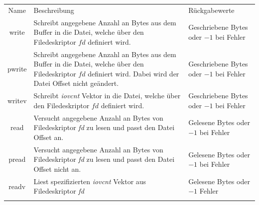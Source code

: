                     \begin{table}[ht]
                        \small
                        \centering
                        \begin{tabular}{cp{6cm}p{3cm}}
                            \hline
                            \rowcolor{GruvGray!36}
                            \multicolumn{3}{c}{System Calls}\\
                            \hline
                            Name & Beschreibung & Rückgabewerte\\
                            \hline
                            \hline
                            \rowcolor{GruvGray!16}
                            write   & Schreibt angegebene Anzahl an Bytes aus dem Buffer in die Datei, welche über den Filedeskriptor $fd$ definiert wird. & Geschriebene Bytes oder $-1$ bei Fehler\\
                            pwrite  & Schreibt angegebene Anzahl an Bytes aus dem Buffer in die Datei, welche über den Filedeskriptor $fd$ definiert wird. Dabei wird der Datei Offset nicht geändert.& Geschriebene Bytes oder $-1$ bei Fehler\\
                            \rowcolor{GruvGray!16}
                            writev  & Schreibt \textit{iovcnt} Vektor in die Datei, welche über den Filedeskriptor $fd$ definiert wird.& Geschriebene Bytes oder $-1$ bei Fehler\\

                            read    & Versucht angegebene Anzahl an Bytes von Filedeskriptor \textit{fd} zu lesen und passt den Datei Offset an.                                              & Gelesene Bytes oder $-1$ bei Fehler\\
                            \rowcolor{GruvGray!16}
                            pread   & Versucht angegebene Anzahl an Bytes von Filedeskriptor \textit{fd} zu lesen und passt den Datei Offset nicht an.                                        & Gelesene Bytes oder $-1$ bei Fehler\\
                            readv   & Liest spezifizierten \textit{iovcnt} Vektor aus Filedeskriptor \textit{fd} & Gelesene Bytes oder $-1$ Fehler\\

                            \rowcolor{GruvGray!16}


\end{tabular}
\end{table}
